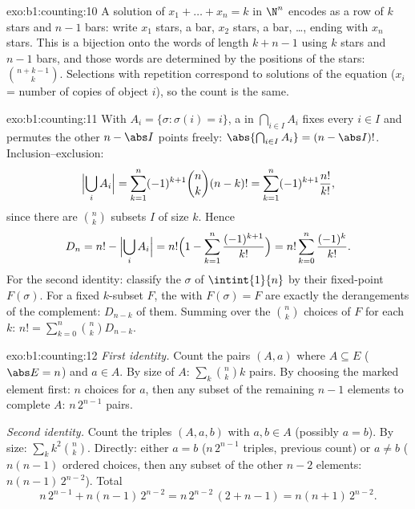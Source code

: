 \begin{solution}{exo:b1:counting:10}
A solution of $x_1 + \dots + x_n = k$ in $\N^n$ encodes as a row of
$k$ stars and $n - 1$ bars: write $x_1$ stars, a bar, $x_2$ stars, a
bar, \dots, ending with $x_n$ stars. This is a bijection onto the
words of length $k + n - 1$ using $k$ stars and $n - 1$ bars, and
those words are determined by the positions of the stars:
$\binom{n + k - 1}{k}$. Selections with repetition correspond to
solutions of the equation ($x_i$ = number of copies of object $i$), so
the count is the same.
\end{solution}

\begin{solution}{exo:b1:counting:11}
With $A_i = \{\sigma : \sigma(i) = i\}$, a  in
$\bigcap_{i \in I} A_i$ fixes every $i \in I$ and permutes the other
$n - \abs I$ points freely: $\abs{\bigcap_{i \in I} A_i} =
(n - \abs I)!$. Inclusion--exclusion:
\[
\Bigl|\bigcup_i A_i\Bigr|
= \sum_{k=1}^{n} (-1)^{k+1} \binom nk (n-k)!
= \sum_{k=1}^{n} (-1)^{k+1} \frac{n!}{k!} ,
\]
since there are $\binom nk$ subsets $I$ of size $k$. Hence
\[
D_n = n! - \Bigl|\bigcup_i A_i\Bigr|
= n!\Bigl(1 - \sum_{k=1}^{n} \frac{(-1)^{k+1}}{k!}\Bigr)
= n! \sum_{k=0}^{n} \frac{(-1)^k}{k!} .
\]
For the second identity: classify the  $\sigma$ of
$\intint{1}{n}$ by their fixed-point  $F(\sigma)$. For a fixed
$k$-subset $F$, the  with $F(\sigma) = F$ are exactly the
derangements of the complement: $D_{n-k}$ of them. Summing over the
$\binom nk$ choices of $F$ for each $k$:
$n! = \sum_{k=0}^{n} \binom nk D_{n-k}$.
\end{solution}

\begin{solution}{exo:b1:counting:12}
\emph{First identity.} Count the pairs $(A, a)$ where $A \subseteq E$
($\abs E = n$) and $a \in A$. By size of $A$: $\sum_k \binom nk k$
pairs. By choosing the marked element first: $n$ choices for $a$, then
any subset of the remaining $n - 1$ elements to complete $A$:
$n\,2^{n-1}$ pairs.

\emph{Second identity.} Count the triples $(A, a, b)$ with $a, b \in
A$ (possibly $a = b$). By size: $\sum_k k^2 \binom nk$. Directly:
either $a = b$ ($n\,2^{n-1}$ triples, previous count) or $a \neq b$
($n(n-1)$ ordered choices, then any subset of the other $n - 2$
elements: $n(n-1)\,2^{n-2}$). Total
\[
n\,2^{n-1} + n(n-1)\,2^{n-2} = n\,2^{n-2}\,(2 + n - 1)
= n(n+1)\,2^{n-2} .
\]
\end{solution}

